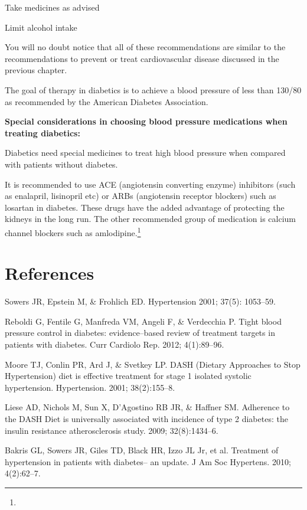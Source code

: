  \item Take medicines as advised

 \item Limit alcohol intake

You will no doubt notice that all of these recommendations are similar to the recommendations to prevent or treat cardiovascular disease discussed in the previous chapter.

The goal of therapy in diabetics is to achieve a blood pressure of less than 130/80 as recommended by the American Diabetes Association.

\textbf{Special considerations in choosing blood pressure medications when treating diabetics:}

Diabetics need special medicines to treat high blood pressure when compared with patients without diabetes. 

It is recommended to use ACE (angiotensin converting enzyme) inhibitors (such as enalapril, lisinopril etc) or ARBs (angiotensin receptor blockers) such as losartan in diabetes. These drugs have the added advantage of protecting the kidneys in the long run. The other recommended group of medication is calcium channel blockers such as amlodipine.\footnote{}

\section*{References}

\begin{thebibliography}{99}
 Sowers JR, Epstein M, \& Frohlich ED. Hypertension 2001; 37(5): 1053–59.

  Reboldi G, Fentile G, Manfreda VM, Angeli F, \& Verdecchia P. Tight blood pressure control in diabetes: evidence–based review of treatment targets in patients with diabetes. Curr Cardiolo Rep. 2012; 4(1):89–96.

  Moore TJ, Conlin PR, Ard J, \& Svetkey LP. DASH (Dietary Approaches to Stop Hypertension) diet is effective treatment for stage 1 isolated systolic hypertension. Hypertension. 2001; 38(2):155–8.

  Liese AD, Nichols M, Sun X, D’Agostino RB JR, \& Haffner SM. Adherence to the DASH Diet is universally associated with incidence of type 2 diabetes: the insulin resistance atherosclerosis study. 2009; 32(8):1434–6.

  Bakris GL, Sowers JR, Giles TD, Black HR, Izzo JL Jr, et al. Treatment of hypertension in patients with diabetes– an update. J Am Soc Hypertens. 2010; 4(2):62–7.

 \end{thebibliography}



